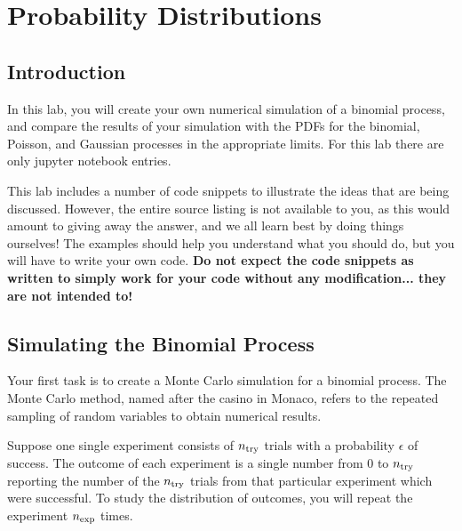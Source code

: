 \chapter{Probability Distributions}

%
%

\section{Introduction}

In this lab, you will create your own numerical simulation of a binomial
process, and compare the results of your simulation with the PDFs for
the binomial, Poisson, and Gaussian processes in the appropriate
limits.  For this lab there are only jupyter notebook entries. 


This lab includes a number of code snippets to illustrate the ideas
that are being discussed.  However, the entire source listing is not
available to you, as this would amount to giving away the answer, and
we all learn best by doing things ourselves!  The examples should
help you understand what you should do, but you will have to write
your own code.  {\bf Do not expect the code snippets as written to
  simply work for your code without any modification... they are not
  intended to!}

\section{Simulating the Binomial Process}

Your first task is to create a Monte Carlo simulation for a binomial
process.  The Monte Carlo method, named after the casino in Monaco, refers
to the repeated sampling of random variables to obtain numerical results.

Suppose one single experiment consists of $n_{\rm try}$ trials with a
probability $\epsilon$ of success.  The outcome of each experiment is
a single number from 0 to $n_{\rm try}$ reporting the number of the
$n_{\rm try}$ trials from that particular experiment which were
successful.  To study the distribution of outcomes, you will repeat the
experiment $n_{\rm exp}$ times.

